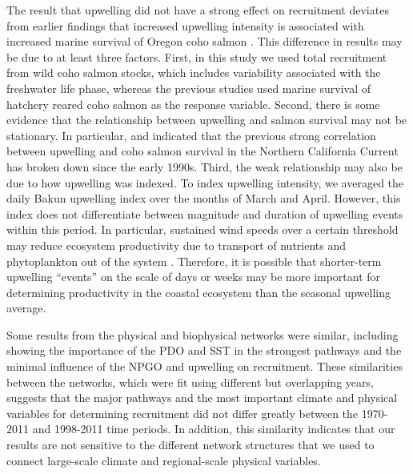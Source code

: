 The result that upwelling did not have a strong effect on recruitment deviates
from earlier findings that increased upwelling intensity is associated with
increased marine survival of Oregon coho salmon \citep{Fisher1988a,
Logerwell2003a}. This difference in results may be due to at least three
factors. First, in this study we used total recruitment from wild coho salmon
stocks, which includes variability associated with the freshwater life phase,
whereas the previous studies used marine survival of hatchery reared coho salmon
as the response variable. Second, there is some evidence that the relationship
between upwelling and salmon survival may not be stationary. In particular,
\citet{Botsford2002} and \citet{Pearcy1997} indicated that the previous strong
correlation between upwelling and coho salmon survival in the Northern
California Current has broken down since the early 1990s.  Third, the weak
relationship may also be due to how upwelling was indexed. To index upwelling
intensity, we averaged the daily Bakun upwelling index over the months of March
and April. However, this index does not differentiate between magnitude and
duration of upwelling events within this period. In particular, sustained wind
speeds over a certain threshold may reduce ecosystem productivity due to
transport of nutrients and phytoplankton out of the system \citep{Botsford2006,
Botsford2003}. Therefore, it is possible that shorter-term upwelling ``events''
on the scale of days or weeks may be more important for determining productivity
in the coastal ecosystem than the seasonal upwelling average.

Some results from the physical and biophysical networks were similar, including
showing the importance of the PDO and SST in the strongest pathways and the
minimal influence of the NPGO and upwelling on recruitment. These similarities
between the networks, which were fit using different but overlapping years,
suggests that the major pathways and the most important climate and physical
variables for determining recruitment did not differ greatly between the
1970-2011 and 1998-2011 time periods. In addition, this similarity indicates
that our results are not sensitive to the different network structures that we
used to connect large-scale climate and regional-scale physical variables.

